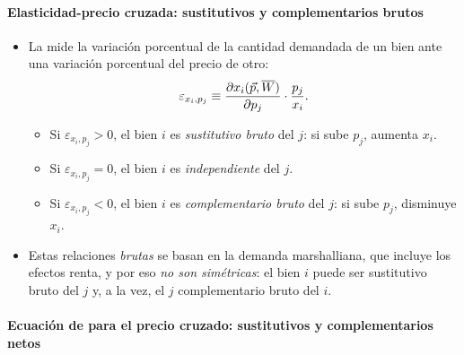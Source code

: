\documentclass[11pt]{article}
\begin{document}
\paragraph{Elasticidad-precio cruzada: sustitutivos y complementarios brutos}

\begin{itemize}
\item La  mide la variación porcentual de la cantidad demandada de un bien ante una variación porcentual del precio de otro:
  \begin{equation}
  \varepsilon_{x_i,p_j}\equiv\frac{\partial x_i(\vec{p},\overline{W})}{\partial p_j}\cdot\frac{p_j}{x_i}. \label{eq:elasticidad-cruzada}
  \end{equation}
  \begin{itemize}
  \item Si $\varepsilon_{x_i,p_j}>0$, el bien $i$ es \emph{sustitutivo bruto} del $j$: si sube $p_j$, aumenta $x_i$.
  \item Si $\varepsilon_{x_i,p_j}=0$, el bien $i$ es \emph{independiente} del $j$.
  \item Si $\varepsilon_{x_i,p_j}<0$, el bien $i$ es \emph{complementario bruto} del $j$: si sube $p_j$, disminuye $x_i$.
  \end{itemize}
\item Estas relaciones \emph{brutas} se basan en la demanda marshalliana, que incluye los efectos renta, y por eso \emph{no son simétricas}: el bien $i$ puede ser sustitutivo bruto del $j$ y, a la vez, el $j$ complementario bruto del $i$.
\end{itemize}

\paragraph{Ecuación de  para el precio cruzado: sustitutivos y complementarios netos}
\end{document}
